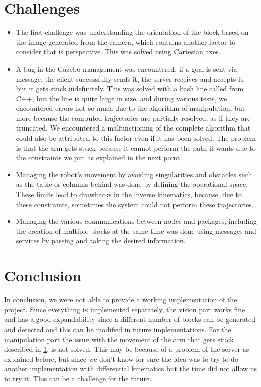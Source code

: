 \documentclass[12pt,a4paper]{article}
\begin{document}
\section{Challenges}\label{sec:challenges}
\begin{itemize}
    \item The first challenge was understanding the orientation of the block based on the image generated from the camera, which contains another factor to consider that is perspective. This was solved using Cartesian axes.
    \item A bug in the Gazebo management was encountered: if a goal is sent via message, the client successfully sends it, the server receives and accepts it, but it gets stuck indefinitely. This was solved with a bash line called from C++, but the line is quite large in size, and during various tests, we encountered errors not so much due to the algorithm of manipulation, but more because the computed trajectories are partially resolved, as if they are truncated. We encountered a malfunctioning of the complete algorithm that could also be attributed to this factor even if it has been solved. The problem is that the arm gets stuck because it cannot perform the path it wants due to the constraints we put as explained in the next point.
    \item Managing the robot’s movement by avoiding singularities and obstacles such as the table or columns behind was done by defining the operational space. These limits lead to drawbacks in the inverse kinematics, because, due to these constraints, sometimes the system could not perform these trajectories.
    \item Managing the various communications between nodes and packages, including the creation of multiple blocks at the same time was done using messages and services by passing and taking the desired information.
\end{itemize}

\section{Conclusion}\label{sec:conclusion}
In conclusion, we were not able to provide a working implementation of the project. Since everything is implemented separately, the vision part works fine and has a good expandability since a different number of blocks can be generated and detected and this can be modified in future implementations. For the manipulation part the issue with the movement of the arm that gets stuck described in \ref{sec:challenges}, is not solved. This may be because of a problem of the server as explained before, but since we don't know for sure the idea was to try to do another implementation with differential kinematics but the time did not allow us to try it. This can be a challenge for the future.
\end{document}
